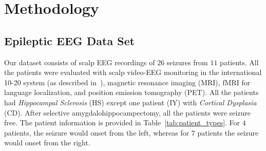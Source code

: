 \documentclass{article} %
\begin{document}
\section{Methodology} \label{sec:method}

\subsection{Epileptic EEG Data Set} \label{sec:eeg_data}
Our dataset consists of scalp EEG recordings of $26$ seizures from $11$ patients.  All the patients were evaluated with scalp video-EEG monitoring in the international 10-20 system (as described in~\cite{jasper_1020}), magnetic resonance imaging (MRI), fMRI for language localization, and position emission tomography (PET).  All the patients had {\em Hippocampal Sclerosis} (HS) except one patient (IY) with {\em Cortical Dysplasia} (CD). After selective amygdalohippocampectomy, all the patients were seizure free.  The patient information is provided in Table~\ref{tab:patient_types}.  For $4$ patients, the seizure would onset from the left, whereas for $7$ patients the seizure would onset from the right. 
\end{document}

